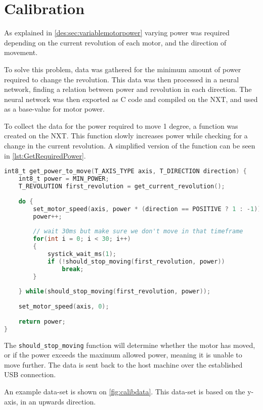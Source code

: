 \section{Calibration}\label{sec:calibration}
As explained in \autoref{des:sec:variablemotorpower} varying power was required depending on the current revolution of each motor, and the direction of movement.

To solve this problem, data was gathered for the minimum amount of power required to change the revolution.
This data was then processed in a neural network, finding a relation between power and revolution in each direction.
The neural network was then exported as C code and compiled on the NXT, and used as a base-value for motor power.

To collect the data for the power required to move 1 degree, a function was created on the NXT.
This function slowly increases power while checking for a change in the current revolution. 
A simplified version of the function can be seen in \autoref{lst:GetRequiredPower}.


\begin{lstlisting}[language=C,label={lst:GetRequiredPower},caption={Getting required power to move }]
int8_t get_power_to_move(T_AXIS_TYPE axis, T_DIRECTION direction) {
	int8_t power = MIN_POWER;
	T_REVOLUTION first_revolution = get_current_revolution();
	
	do {
		set_motor_speed(axis, power * (direction == POSITIVE ? 1 : -1));
		power++;
		
		// wait 30ms but make sure we don't move in that timeframe
		for(int i = 0; i < 30; i++)
		{
			systick_wait_ms(1);
			if (!should_stop_moving(first_revolution, power))
				break;
		}
	
	} while(should_stop_moving(first_revolution, power));
	
	set_motor_speed(axis, 0);
	
	return power;
}

\end{lstlisting}

The \texttt{should\_stop\_moving} function will determine whether the motor has moved, or if the power exceeds the maximum allowed power, meaning it is unable to move further.
The data is sent back to the host machine over the established USB connection.


An example data-set is shown on \autoref{fig:calibdata}.
This data-set is based on the y-axis, in an upwards direction.


